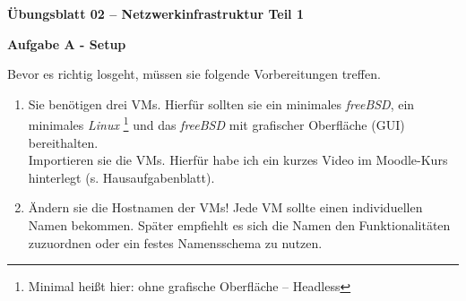 \documentclass[paper=a4,fontsize=11pt]{scrartcl}%
\begin{document}
\begin{center}
\Large{\textbf{Übungsblatt 02 -- Netzwerkinfrastruktur Teil 1}}\\
\end{center}

\begin{center}\Large{\textbf{Aufgabe A - Setup}}\end{center}
Bevor es richtig losgeht, müssen sie folgende Vorbereitungen treffen.
\begin{enumerate}
	\item Sie benötigen drei VMs. Hierfür sollten sie ein minimales \emph{freeBSD}, ein minimales \emph{Linux} \footnote{Minimal heißt hier: ohne grafische Oberfläche -- Headless} und das \emph{freeBSD} mit grafischer Oberfläche (GUI) bereithalten. \\
Importieren sie die VMs. Hierfür habe ich ein kurzes Video im Moodle-Kurs hinterlegt (s. Hausaufgabenblatt).
	\item Ändern sie die Hostnamen der VMs! Jede VM sollte einen individuellen Namen bekommen. Später empfiehlt es sich die Namen den Funktionalitäten zuzuordnen oder ein festes Namensschema zu nutzen.
\end{enumerate}
	
\end{document}
